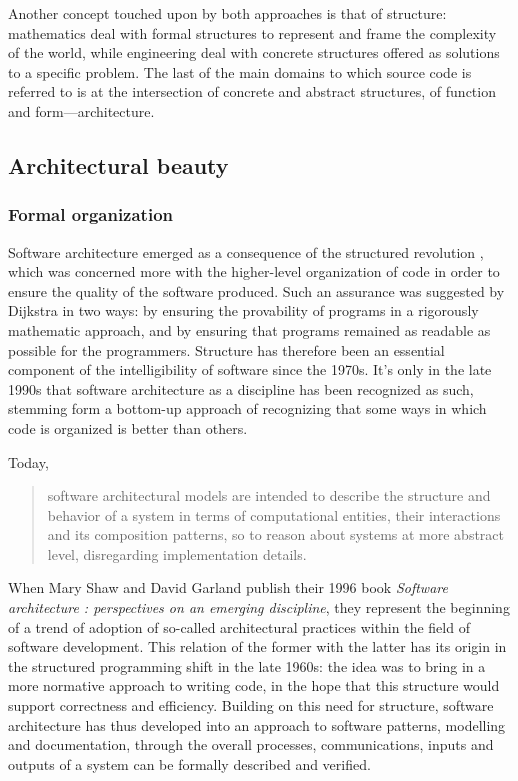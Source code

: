 Another concept touched upon by both approaches is that of structure: mathematics deal with formal structures to represent and frame the complexity of the world, while engineering deal with concrete structures offered as solutions to a specific problem. The last of the main domains to which source code is referred to is at the intersection of concrete and abstract structures, of function and form—architecture.

\subsection{Architectural beauty}
\label{subsec:beauty-architecture}

\subsubsection{Formal organization}
\label{subsubsec:formal-organization}

Software architecture emerged as a consequence of the structured revolution \citep{dijkstra_chapter_1972}, which was concerned more with the higher-level organization of code in order to ensure the quality of the software produced. Such an assurance was suggested by Dijkstra in two ways: by ensuring the provability of programs in a rigorously mathematic approach, and by ensuring that programs remained as readable as possible for the programmers. Structure has therefore been an essential component of the intelligibility of software since the 1970s. It's only in the late 1990s that software architecture as a discipline has been recognized as such, stemming form a bottom-up approach of recognizing that some ways in which code is organized is better than others.

Today,
\begin{quote}
  software architectural models are intended to describe the structure and behavior of a system in terms of computational entities, their interactions and its composition patterns, so to reason about systems at more abstract  level, disregarding implementation details. \citep{garland_software_2000}
\end{quote}

When Mary Shaw and David Garland publish their 1996 book \emph{Software architecture : perspectives on an emerging discipline}, they represent the beginning of a trend of adoption of so-called architectural practices within the field of software development. This relation of the former with the latter has its origin in the structured programming shift in the late 1960s: the idea was to bring in a more normative approach to writing code, in the hope that this structure would support correctness and efficiency. Building on this need for structure, software architecture has thus developed into an approach to software patterns, modelling and documentation, through the overall processes, communications, inputs and outputs of a system can be formally described and verified.

